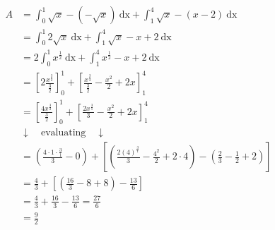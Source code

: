 \documentclass{book}
\begin{document}
\begin{align*}
    A&= \int_{0}^{1} \sqrt{x}-(-\sqrt{x}) \ \text{dx} + \int_{1}^{4} \sqrt{x}-(x-2)\ \text{dx}   \\
     &= \int_{0}^{1} 2\sqrt{x} \ \text{dx} + \int_{1}^{4} \sqrt{x} - x + 2 \ \text{dx}    \\
     &= 2 \int_{0}^{1} x^{\frac{1}{2}}\ \text{dx}+ \int_{1}^{4} x^{\frac{1}{2}}-x+2 \ \text{dx}   \\
     &= \left[2\frac{x^{\frac{3}{2}}}{\frac{3}{2}}\right]_0^1+ \left[\frac{x^{\frac{3}{2}}}{\frac{3}{2}}-\frac{x^2}{2}+2x\right]_1^4 \\
     &= \left[\frac{4x^{\frac{3}{2}}}{\frac{3}{2}}\right]_0^1 + \left[ \frac{2x^{\frac{3}{1}}}{3}-\frac{x^2}{2}+2x \right]_1^4 \\
     &     \downarrow  \quad\text{evaluating}\quad \downarrow \\
     &= \left( \frac{4\cdot 1\cdot \frac{3}{1}}{3}-0 \right)+ \left[\left(
     \frac{2(4)^{\frac{3}{1}}}{3}- \frac{4^2}{2}+2\cdot 4  \right)-\left( \frac{2}{3}-\frac{1}{2}+2 \right)  \right]   \\
     &= \frac{4}{3}+\left[ \left(\frac{16}{3}-8+8\right) -\frac{13}{6}\right]  \\
     &= \frac{4}{3} + \frac{16}{3}-\frac{13}{6}= \frac{27}{6} \\
     &=\frac{9}{2}\\
\end{align*}

\end{document}
